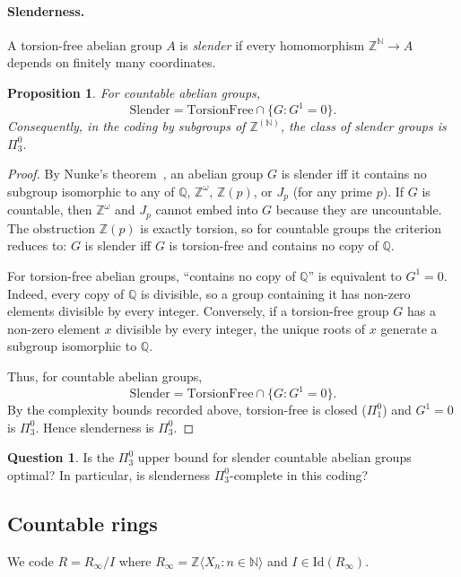 \documentclass[12pt,fleqn,a4paper]{amsart}
\numberwithin{equation}{section}
\newtheorem{proposition}[theorem]{Proposition}
\theoremstyle{definition}
\newtheorem{question}[theorem]{Question}
\newcommand{\N}{\mathbb{N}}
\newcommand{\Q}{\mathbb{Q}}
\newcommand{\Z}{\mathbb{Z}}
\newcommand{\Id}{\mathrm{Id}}
\begin{document}
\paragraph{Slenderness.}
A torsion-free abelian group $A$ is \emph{slender} if every homomorphism
$\Z^\N\to A$ depends on finitely many coordinates.

\begin{proposition}\label{prop:slender-Pi03}
For countable abelian groups,
\[
\mathrm{Slender}=\mathrm{TorsionFree}\cap \{G : G^1=0\}.
\]
Consequently, in the coding by subgroups of $\Z^{(\N)}$, the class of slender groups is
$\Pi^0_3$.
\end{proposition}

\begin{proof}
By Nunke's theorem~\cite{Nunke1962}, an abelian group $G$ is slender iff it contains no subgroup
isomorphic to any of $\Q$, $\Z^\omega$, $\Z(p)$, or $J_p$ (for any prime $p$).
If $G$ is countable, then $\Z^\omega$ and $J_p$ cannot embed into $G$ because they are
uncountable. The obstruction $\Z(p)$ is exactly torsion, so for countable groups the
criterion reduces to: $G$ is slender iff $G$ is torsion-free and contains no copy of
$\Q$.

For torsion-free abelian groups, ``contains no copy of $\Q$'' is equivalent to $G^1=0$.
Indeed, every copy of $\Q$ is divisible, so a group containing it has non-zero elements
divisible by every integer.
Conversely, if a torsion-free group $G$ has a non-zero element $x$ divisible by every
integer, the unique roots of $x$ generate a subgroup isomorphic to $\Q$.

Thus, for countable abelian groups,
\[
\mathrm{Slender}=\mathrm{TorsionFree}\cap \{G : G^1=0\}.
\]
By the complexity bounds recorded above, torsion-free is closed ($\Pi^0_1$) and $G^1=0$
is $\Pi^0_3$. Hence slenderness is $\Pi^0_3$.
\end{proof}

\begin{question}\label{qu:slender-optimal}
Is the $\Pi^0_3$ upper bound for slender countable abelian groups optimal?
In particular, is slenderness $\Pi^0_3$-complete in this coding?
\end{question}

\subsection{Countable rings}\label{subsec:rings}

We code $R=R_\infty/I$ where $R_\infty=\Z\langle X_n:n\in\N\rangle$ and
$I\in\Id(R_\infty)$.
\end{document}
